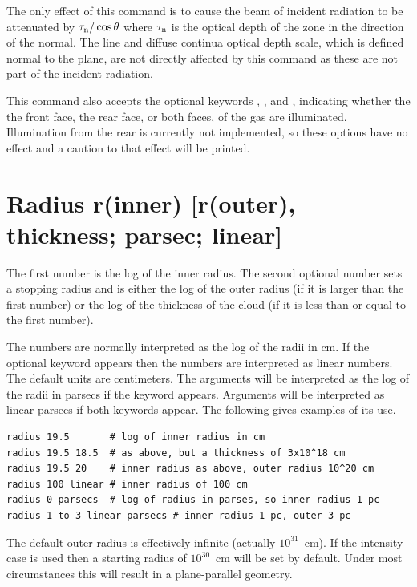 The only effect of this command is to cause the beam of incident radiation
to be attenuated by $\tau_{\rm n} / \cos\theta$ where $\tau_{\rm n}$
is the optical depth of the zone in the direction of the normal.
The line and diffuse continua optical depth scale, which is
defined normal to the plane, are not directly affected by this command
as these are not part of the incident radiation.

This command also accepts the optional keywords ,
, and , indicating whether the
the front face, the rear face, or both faces, of the gas are illuminated.
Illumination from the rear is currently not implemented, so these options
have no effect and a caution to that effect will be printed.

\section{Radius r(inner)  [r(outer), thickness; parsec; linear]}
\label{sec:RadiusCommand}

The first number is the log of the inner radius.
The second optional
number sets a stopping radius and is either the log of the
outer radius
(if it is larger than the first number) or the log of the thickness of the
cloud (if it is less than or equal to the first number).

The numbers are normally interpreted as the log of the radii in cm.
If the optional keyword  appears then
the numbers are interpreted
as linear numbers.
The default units are centimeters.
The arguments will
be interpreted as the log of the radii in parsecs if the keyword
 appears.
Arguments will be interpreted as linear parsecs if both keywords
appear.
The following gives examples of its use.
\begin{verbatim}
radius 19.5       # log of inner radius in cm
radius 19.5 18.5  # as above, but a thickness of 3x10^18 cm
radius 19.5 20    # inner radius as above, outer radius 10^20 cm
radius 100 linear # inner radius of 100 cm
radius 0 parsecs  # log of radius in parses, so inner radius 1 pc
radius 1 to 3 linear parsecs # inner radius 1 pc, outer 3 pc
\end{verbatim}

The default outer radius is effectively infinite (actually $10^{31}$~cm).
If the intensity case is used then a starting radius of $10^{30}$~cm
will be set by default.
Under most circumstances this will result in a
plane-parallel geometry.


